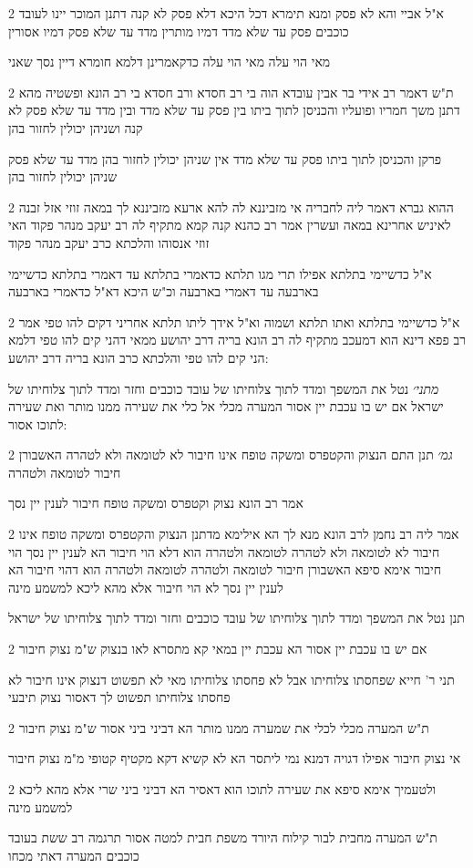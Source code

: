 \documentclass[12pt, openany]{book}
\newcommand{\sethebfont}{
\fontsize{10.5pt}{21.0pt} \selectfont
}
\newcommand{\twocol}[1]{
	{\sethebfont \begin{multicols}{2}
			#1
	\end{multicols}}	
}
\begin{document}
\twocol{א"ל אביי והא לא פסק ומנא תימרא דכל היכא דלא פסק לא קנה דתנן המוכר יינו לעובד כוכבים פסק עד שלא מדד דמיו מותרין מדד עד שלא פסק דמיו אסורין
\par מאי הוי עלה מאי הוי עלה כדקאמרינן דלמא חומרא דיין נסך שאני}
\twocol{ת"ש דאמר רב אידי בר אבין עובדא הוה בי רב חסדא ורב חסדא בי רב הונא ופשטיה מהא דתנן משך חמריו ופועליו והכניסן לתוך ביתו בין פסק עד שלא מדד ובין מדד עד שלא פסק לא קנה ושניהן יכולין לחזור בהן
\par פרקן והכניסן לתוך ביתו פסק עד שלא מדד אין שניהן יכולין לחזור בהן מדד עד שלא פסק שניהן יכולין לחזור בהן}
\twocol{ההוא גברא דאמר ליה לחבריה אי מזביננא לה להא ארעא מזביננא לך במאה זוזי אזל זבנה לאיניש אחרינא במאה ועשרין אמר רב כהנא קנה קמא מתקיף לה רב יעקב מנהר פקוד האי זוזי אנסוהו והלכתא כרב יעקב מנהר פקוד
\par א"ל כדשיימי בתלתא אפילו תרי מגו תלתא כדאמרי בתלתא עד דאמרי בתלתא כדשיימי בארבעה עד דאמרי בארבעה וכ"ש היכא דא"ל כדאמרי בארבעה}
\twocol{א"ל כדשיימי בתלתא ואתו תלתא ושמוה וא"ל אידך ליתו תלתא אחריני דקים להו טפי אמר רב פפא דינא הוא דמעכב מתקיף לה רב הונא בריה דרב יהושע ממאי דהני קים להו טפי דלמא הני קים להו טפי והלכתא כרב הונא בריה דרב יהושע:
\par {\large\emph{מתני׳}} נטל את המשפך ומדד לתוך צלוחיתו של עובד כוכבים וחזר ומדד לתוך צלוחיתו של ישראל אם יש בו עכבת יין אסור המערה מכלי אל כלי את שעירה ממנו מותר ואת שעירה לתוכו אסור:}
\twocol{{\large\emph{גמ׳}} תנן התם הנצוק והקטפרס ומשקה טופח אינו חיבור לא לטומאה ולא לטהרה האשבורן חיבור לטומאה ולטהרה
\par אמר רב הונא נצוק וקטפרס ומשקה טופח חיבור לענין יין נסך}
\twocol{אמר ליה רב נחמן לרב הונא מנא לך הא אילימא מדתנן הנצוק והקטפרס ומשקה טופח אינו חיבור לא לטומאה ולא לטהרה לטומאה ולטהרה הוא דלא הוי חיבור הא לענין יין נסך הוי חיבור אימא סיפא האשבורן חיבור לטומאה ולטהרה לטומאה ולטהרה הוא דהוי חיבור הא לענין יין נסך לא הוי חיבור אלא מהא ליכא למשמע מינה
\par תנן נטל את המשפך ומדד לתוך צלוחיתו של עובד כוכבים וחזר ומדד לתוך צלוחיתו של ישראל}
\twocol{אם יש בו עכבת יין אסור הא עכבת יין במאי קא מתסרא לאו בנצוק ש"מ נצוק חיבור
\par תני ר' חייא שפחסתו צלוחיתו אבל לא פחסתו צלוחיתו מאי לא תפשוט דנצוק אינו חיבור לא פחסתו צלוחיתו תפשוט לך דאסור נצוק תיבעי}
\twocol{ת"ש המערה מכלי לכלי את שמערה ממנו מותר הא דביני ביני אסור ש"מ נצוק חיבור
\par אי נצוק חיבור אפילו דגויה דמנא נמי ליתסר הא לא קשיא דקא מקטיף קטופי מ"מ נצוק חיבור}
\twocol{ולטעמיך אימא סיפא את שעירה לתוכו הוא דאסיר הא דביני ביני שרי אלא מהא ליכא למשמע מינה
\par ת"ש המערה מחבית לבור קילוח היורד משפת חבית למטה אסור תרגמה רב ששת בעובד כוכבים המערה דאתי מכחו}
\end{document}
